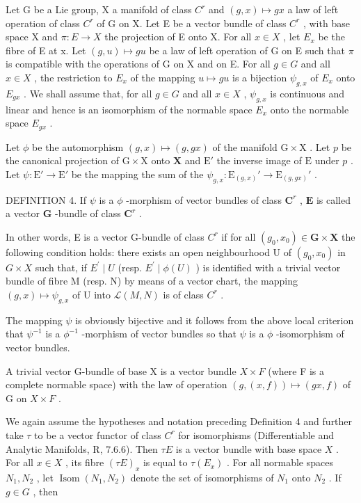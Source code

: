 Let G be a Lie group, X a manifold of class \(C^{r}\) and \((g, x) \mapsto gx\) a law of left operation of class \(C^{r}\) of G on X. Let E be a vector bundle of class \(C^{r}\) , with base space X and \(\pi: E \to X\) the projection of E onto X. For all \(x \in X\) , let \(E_{x}\) be the fibre of E at x. Let \((g, u) \mapsto gu\) be a law of left operation of G on E such that \(\pi\) is compatible with the operations of G on X and on E. For all \(g \in G\) and all \(x \in X\) , the restriction to \(E_{x}\) of the mapping \(u \mapsto gu\) is a bijection \(\psi_{g,x}\) of \(E_{x}\) onto \(E_{gx}\) . We shall assume that, for all \(g \in G\) and all \(x \in X\) , \(\psi_{g,x}\) is continuous and linear and hence is an isomorphism of the normable space \(E_{x}\) onto the normable space \(E_{gx}\) .

Let \(\phi\) be the automorphism \((g,x)\mapsto (g,gx)\) of the manifold \(\mathrm{G}\times \mathrm{X}\) . Let \(p\) be the canonical projection of \(\mathrm{G}\times \mathrm{X}\) onto \(\mathbf{X}\) and \(\mathrm{E}'\) the inverse image of \(\mathrm{E}\) under \(p\) . Let \(\psi \colon \mathrm{E}'\to \mathrm{E}'\) be the mapping the sum of the \(\psi_{g,x}\colon \mathrm{E}_{(g,x)}'\to \mathrm{E}_{(g,gx)}'\) .

DEFINITION 4. If \(\psi\) is a \(\phi\) -morphism of vector bundles of class \(\mathbf{C}^r\) , \(\mathbf{E}\) is called a vector \(\mathbf{G}\) -bundle of class \(\mathbf{C}^r\) .

In other words, E is a vector G-bundle of class \(C^{r}\) if for all \((g_{0}, x_{0}) \in \mathbf{G} \times \mathbf{X}\) the following condition holds: there exists an open neighbourhood U of \((g_{0}, x_{0})\) in \(G \times X\) such that, if \(E^{\prime} \mid U\) (resp. \(E^{\prime} \mid \phi(U)\) ) is identified with a trivial vector bundle of fibre M (resp. N) by means of a vector chart, the mapping \((g, x) \mapsto \psi_{g,x}\) of U into \(\mathcal{L}(M, N)\) is of class \(C^{r}\) .

The mapping \(\psi\) is obviously bijective and it follows from the above local criterion that \(\psi^{-1}\) is a \(\phi^{-1}\) -morphism of vector bundles so that \(\psi\) is a \(\phi\) -isomorphism of vector bundles.

A trivial vector G-bundle of base X is a vector bundle \(X \times F\) (where F is a complete normable space) with the law of operation \((g, (x, f)) \mapsto (gx, f)\) of G on \(X \times F\) .

We again assume the hypotheses and notation preceding Definition 4 and further take \(\tau\) to be a vector functor of class \(C^r\) for isomorphisms (Differentiable and Analytic Manifolds, R, 7.6.6). Then \(\tau E\) is a vector bundle with base space \(X\) . For all \(x \in X\) , its fibre \((\tau E)_x\) is equal to \(\tau (E_x)\) . For all normable spaces \(N_1, N_2\) , let \(\operatorname{Isom}(N_1, N_2)\) denote the set of isomorphisms of \(N_1\) onto \(N_2\) . If \(g \in G\) , then

